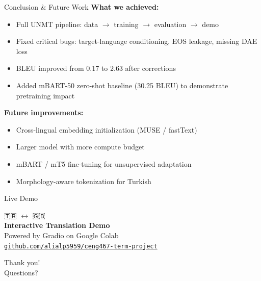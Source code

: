 \documentclass[aspectratio=169]{beamer}
\begin{document}
\begin{frame}{Conclusion \& Future Work}
  \textbf{What we achieved:}
  \begin{itemize}
    \item Full UNMT pipeline: data $\rightarrow$ training $\rightarrow$ evaluation $\rightarrow$ demo
    \item Fixed critical bugs: target-language conditioning, EOS leakage, missing DAE loss
    \item BLEU improved from 0.17 to 2.63 after corrections
    \item Added mBART-50 zero-shot baseline (30.25 BLEU) to demonstrate pretraining impact
  \end{itemize}
  \vfill
  \textbf{Future improvements:}
  \begin{itemize}
    \item Cross-lingual embedding initialization (MUSE / fastText)
    \item Larger model with more compute budget
    \item mBART / mT5 fine-tuning for unsupervised adaptation
    \item Morphology-aware tokenization for Turkish
  \end{itemize}
\end{frame}

\begin{frame}{Live Demo}
  \begin{center}
    \Huge 🇹🇷 $\leftrightarrow$ 🇬🇧 \\[0.5cm]
    \Large \textbf{Interactive Translation Demo} \\[0.3cm]
    \normalsize Powered by Gradio on Google Colab \\[0.2cm]
    \small \href{https://github.com/alialp5959/ceng467-term-project}{\texttt{github.com/alialp5959/ceng467-term-project}}
  \end{center}
\end{frame}

\begin{frame}[standout]
  Thank you! \\[0.5cm]
  \normalsize Questions?
\end{frame}
\end{document}
